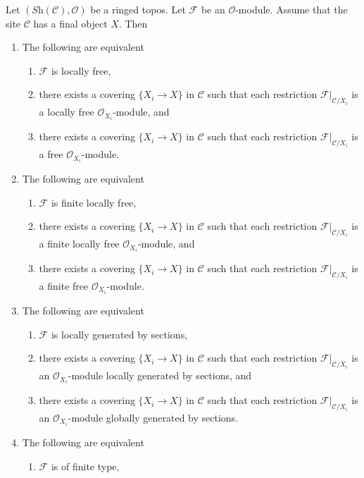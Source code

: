 \begin{lemma}
\label{lemma-local-final-object}
Let $(\textit{Sh}(\mathcal{C}), \mathcal{O})$
be a ringed topos. Let $\mathcal{F}$ be an $\mathcal{O}$-module.
Assume that the site $\mathcal{C}$ has a final object $X$.
Then
\begin{enumerate}
\item The following are equivalent
\begin{enumerate}
\item $\mathcal{F}$ is locally free,
\item there exists a covering $\{X_i \to X\}$ in $\mathcal{C}$ such that
each restriction $\mathcal{F}|_{\mathcal{C}/X_i}$ is a locally free
$\mathcal{O}_{X_i}$-module, and
\item there exists a covering $\{X_i \to X\}$ in $\mathcal{C}$ such that
each restriction $\mathcal{F}|_{\mathcal{C}/X_i}$ is a free
$\mathcal{O}_{X_i}$-module.
\end{enumerate}
\item The following are equivalent
\begin{enumerate}
\item $\mathcal{F}$ is finite locally free,
\item there exists a covering $\{X_i \to X\}$ in $\mathcal{C}$
such that each restriction $\mathcal{F}|_{\mathcal{C}/X_i}$
is a finite locally free $\mathcal{O}_{X_i}$-module, and
\item there exists a covering $\{X_i \to X\}$ in $\mathcal{C}$
such that each restriction $\mathcal{F}|_{\mathcal{C}/X_i}$
is a finite free $\mathcal{O}_{X_i}$-module.
\end{enumerate}
\item The following are equivalent
\begin{enumerate}
\item $\mathcal{F}$ is locally generated by sections,
\item there exists a covering $\{X_i \to X\}$ in $\mathcal{C}$
such that each restriction $\mathcal{F}|_{\mathcal{C}/X_i}$
is an $\mathcal{O}_{X_i}$-module locally generated by sections, and
\item there exists a covering $\{X_i \to X\}$ in $\mathcal{C}$
such that each restriction $\mathcal{F}|_{\mathcal{C}/X_i}$
is an $\mathcal{O}_{X_i}$-module globally generated by sections.
\end{enumerate}
\item The following are equivalent
\begin{enumerate}
\item $\mathcal{F}$ is of finite type,

\end{enumerate}
\end{enumerate}
\end{lemma}
